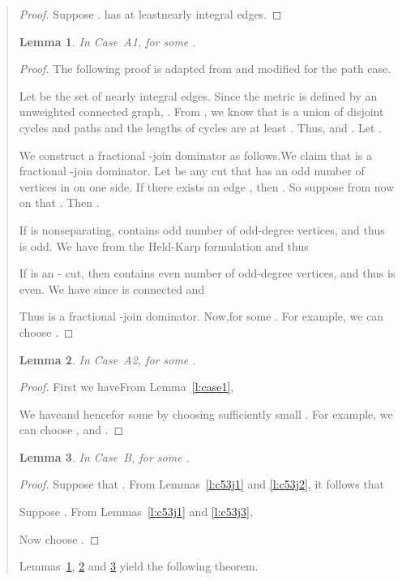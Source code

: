 \documentclass[11pt,letterpaper]{article}
\newtheorem{lemma}{Lemma}
\newcommand{\st}{\mbox{-} }
\begin{document}
\begin{quote}
\begin{proof}
Suppose .  has at leastnearly integral edges.
\end{proof}

\begin{lemma}
\label{l:fca1}
In Case~A1,  for some .
\end{lemma}
\begin{proof}
The following proof is adapted from \cite{OSS} and modified for the path case.

Let  be the set of nearly integral edges. Since the metric is defined by an unweighted connected graph, . From , we know that  is a union of disjoint cycles and paths and the lengths of cycles are at least . Thus,  and . Let .

We construct a fractional -join dominator  as follows.We claim that  is a fractional -join dominator. Let  be any cut that has an odd number of vertices in  on one side. If there exists an edge , then . So suppose from now on that . Then .

If  is nonseparating,  contains odd number of odd-degree vertices, and thus  is odd. We have  from the Held-Karp formulation and thus

If  is an \st cut, then  contains even number of odd-degree vertices, and thus  is even. We have  since  is connected and

Thus  is a fractional -join dominator. Now,for some . For example, we can choose .
\end{proof}

\begin{lemma}
\label{l:fca2}
In Case~A2,  for some .
\end{lemma}
\begin{proof}
First we haveFrom Lemma~\ref{l:case1},

We haveand hencefor some  by choosing sufficiently small . For example, we can choose ,  and .
\end{proof}

\begin{lemma}
\label{l:fcb}
In Case~B,  for some .
\end{lemma}
\begin{proof}
Suppose that . From Lemmas~\ref{l:c53j1} and \ref{l:c53j2}, it follows that

Suppose . From Lemmas~\ref{l:c53j1} and \ref{l:c53j3},

Now choose .
\end{proof}

Lemmas~\ref{l:fca1}, \ref{l:fca2} and \ref{l:fcb} yield the following theorem.


\end{quote}
\end{document}
